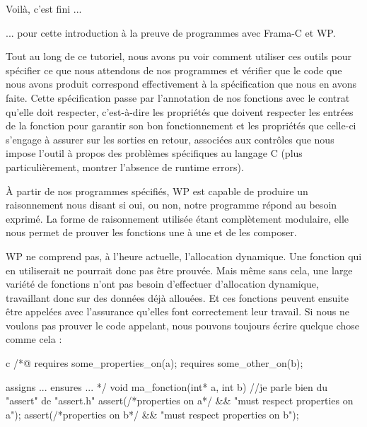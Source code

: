 \begin{Quotation}
Voilà, c'est fini ...
\end{Quotation}



... pour cette introduction à la preuve de programmes avec Frama-C et WP.



Tout au long de ce tutoriel, nous avons pu voir comment utiliser ces outils
pour spécifier ce que nous attendons de nos programmes et vérifier que le code que
nous avons produit correspond effectivement à la spécification que nous en 
avons faite. Cette spécification passe par l'annotation de nos fonctions avec 
le contrat qu'elle doit respecter, c'est-à-dire les propriétés que doivent
respecter les entrées de la fonction pour garantir son bon fonctionnement et 
les propriétés que celle-ci s'engage à assurer sur les sorties en retour,
associées aux contrôles que nous impose l'outil à propos des problèmes
spécifiques au langage C (plus particulièrement, montrer l'absence de runtime
errors).



À partir de nos programmes spécifiés, WP est capable de produire un 
raisonnement nous disant si oui, ou non, notre programme répond au besoin 
exprimé. La forme de raisonnement utilisée étant complètement modulaire, elle 
nous permet de prouver les fonctions une à une et de les composer.

WP ne  comprend pas, à l'heure actuelle, l'allocation dynamique. Une fonction
qui en  utiliserait ne pourrait donc pas être prouvée. Mais même sans cela,
une large variété de fonctions n'ont pas besoin 
d'effectuer d'allocation dynamique, travaillant donc sur des données déjà 
allouées. Et ces fonctions peuvent ensuite être appelées avec l'assurance 
qu'elles font correctement leur travail. Si nous ne voulons pas prouver le 
code appelant, nous pouvons toujours écrire quelque chose comme cela :



\begin{CodeBlock}{c}
/*@
  requires some_properties_on(a);
  requires some_other_on(b);

  assigns ...
  ensures ...
*/
void ma_fonction(int* a, int b){
  //je parle bien du "assert" de "assert.h"
  assert(/*properties on a*/ && "must respect properties on a");  
  assert(/*properties on b*/ && "must respect properties on b");
}
\end{CodeBlock}



